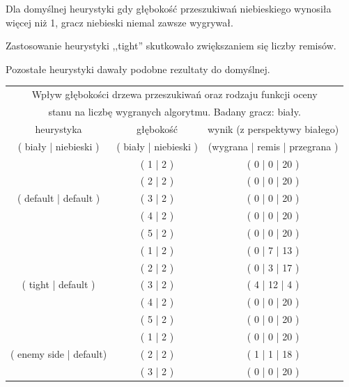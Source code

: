Dla domyślnej heurystyki gdy głębokość przeszukiwań niebieskiego wynosiła
więcej niż 1, gracz niebieski niemal zawsze wygrywał.

Zastosowanie heurystyki ,,tight'' skutkowało zwiększaniem się liczby remisów.

Pozostałe heurystyki dawały podobne rezultaty do domyślnej.

\clearpage

\begin{table}[htbp!]
    \centering
    \begin{tabular}{ |c|c|c|}
            \hline
            \multicolumn{3}{|c|}{Wpływ głębokości drzewa przeszukiwań oraz rodzaju funkcji oceny} \\
            \multicolumn{3}{|c|}{stanu na liczbę wygranych algorytmu. Badany gracz: biały.} \\
            \hline
            heurystyka & głębokość & wynik (z perspektywy białego) \\
            ( biały | niebieski ) & ( biały | niebieski ) & (wygrana | remis | przegrana ) \\
            \hline
            \multirow{5}{*}{( default | default )} & ( 1 | 2 ) & ( 0 | 0 | 20 ) \\
            \cline{2-3}
             & ( 2 | 2 ) & ( 0 | 0 | 20 ) \\
            \cline{2-3}
             & ( 3 | 2 ) & ( 0 | 0 | 20 ) \\
            \cline{2-3}
             & ( 4 | 2 ) & ( 0 | 0 | 20 ) \\
            \cline{2-3}
             & ( 5 | 2 ) & ( 0 | 0 | 20 ) \\
            \hline
            \multirow{5}{*}{( tight | default )} & ( 1 | 2 ) & ( 0 | 7 | 13 ) \\
            \cline{2-3}
             & ( 2 | 2 ) & ( 0 | 3 | 17 ) \\
            \cline{2-3}
             & ( 3 | 2 ) & ( 4 | 12 | 4 ) \\
            \cline{2-3}
             & ( 4 | 2 ) & ( 0 | 0 | 20 ) \\
            \cline{2-3}
             & ( 5 | 2 ) & ( 0 | 0 | 20 ) \\
            \hline
            \multirow{5}{*}{( enemy side | default)} & ( 1 | 2 ) & ( 0 | 0 | 20 ) \\
            \cline{2-3}
             & ( 2 | 2 ) & ( 1 | 1 | 18 ) \\
            \cline{2-3}
             & ( 3 | 2 ) & ( 0 | 0 | 20 ) \\

\end{tabular}
\end{table}
